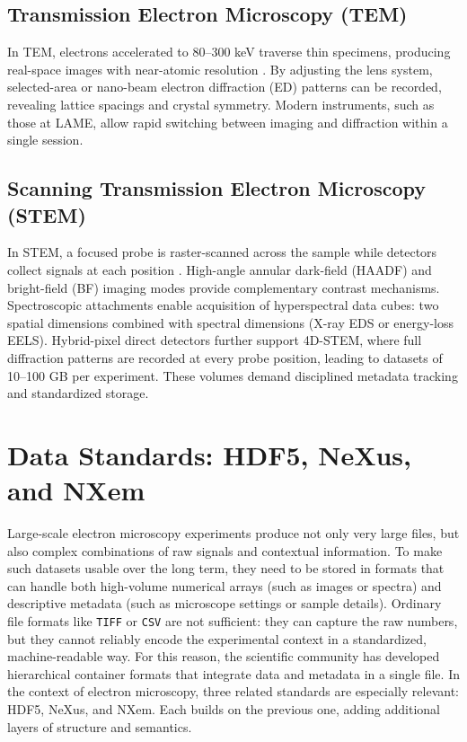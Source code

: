 \subsection{Transmission Electron Microscopy (TEM)}

In TEM, electrons accelerated to 80--300 keV traverse thin specimens, producing real-space images with near-atomic resolution \parencite{EMoverview}. 
By adjusting the lens system, selected-area or nano-beam electron diffraction (ED) patterns can be recorded, revealing lattice spacings and crystal symmetry. 
Modern instruments, such as those at LAME, allow rapid switching between imaging and diffraction within a single session.

\subsection{Scanning Transmission Electron Microscopy (STEM)}

In STEM, a focused probe is raster-scanned across the sample while detectors collect signals at each position \parencite{EMoverview}. 
High-angle annular dark-field (HAADF) and bright-field (BF) imaging modes provide complementary contrast mechanisms. 
Spectroscopic attachments enable acquisition of hyperspectral data cubes: two spatial dimensions combined with spectral dimensions (X-ray EDS or energy-loss EELS). 
Hybrid-pixel direct detectors further support 4D-STEM, where full diffraction patterns are recorded at every probe position, leading to datasets of 10–100 GB per experiment. 
These volumes demand disciplined metadata tracking and standardized storage.

\section{Data Standards: HDF5, NeXus, and NXem}

Large-scale electron microscopy experiments produce not only very large files, but also complex combinations of raw signals and contextual information. 
To make such datasets usable over the long term, they need to be stored in formats that can handle both high-volume numerical arrays (such as images or spectra) and descriptive metadata (such as microscope settings or sample details). 
Ordinary file formats like \texttt{TIFF} or \texttt{CSV} are not sufficient: they can capture the raw numbers, but they cannot reliably encode the experimental context in a standardized, machine-readable way. 
For this reason, the scientific community has developed hierarchical container formats that integrate data and metadata in a single file. 
In the context of electron microscopy, three related standards are especially relevant: HDF5, NeXus, and NXem. 
Each builds on the previous one, adding additional layers of structure and semantics.

